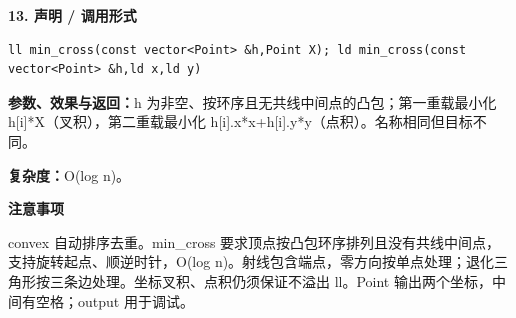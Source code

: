 \documentclass[UTF8,a4paper,10pt]{ctexart}
\newcommand{\TemplNote}[1]{\textbf{注意事项}\par #1\par}
\begin{document}
\noindent\begin{minipage}{\textwidth}
\textbf{13. 声明 / 调用形式}
\begin{lstlisting}
ll min_cross(const vector<Point> &h,Point X); ld min_cross(const vector<Point> &h,ld x,ld y)
\end{lstlisting}
\textbf{参数、效果与返回：}h 为非空、按环序且无共线中间点的凸包；第一重载最小化 h[i]*X（叉积），第二重载最小化 h[i].x*x+h[i].y*y（点积）。名称相同但目标不同。

\textbf{复杂度：}O(log n)。

\TemplNote{convex 自动排序去重。min\_cross 要求顶点按凸包环序排列且没有共线中间点，支持旋转起点、顺逆时针，O(log n)。射线包含端点，零方向按单点处理；退化三角形按三条边处理。坐标叉积、点积仍须保证不溢出 ll。Point 输出两个坐标，中间有空格；output 用于调试。}
\end{minipage}\par\vspace{0.4em}
\end{document}
